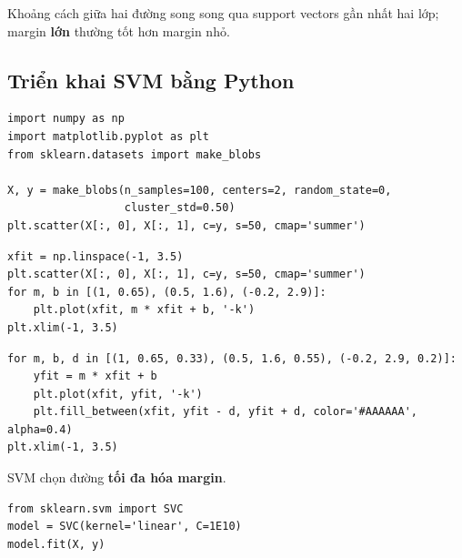 \begin{dinhnghia}[title={Margin}]
Khoảng cách giữa hai đường song song qua support vectors gần nhất hai lớp; margin \textbf{lớn} thường tốt hơn margin nhỏ.
\end{dinhnghia}

\subsection{Triển khai SVM bằng Python}

\begin{vidu}[title={Import và dữ liệu mẫu}]
\begin{lstlisting}
import numpy as np
import matplotlib.pyplot as plt
from sklearn.datasets import make_blobs

X, y = make_blobs(n_samples=100, centers=2, random_state=0,
                  cluster_std=0.50)
plt.scatter(X[:, 0], X[:, 1], c=y, s=50, cmap='summer')
\end{lstlisting}
\end{vidu}

\begin{vidu}[title={Nhiều đường phân tách có thể}]
\begin{lstlisting}
xfit = np.linspace(-1, 3.5)
plt.scatter(X[:, 0], X[:, 1], c=y, s=50, cmap='summer')
for m, b in [(1, 0.65), (0.5, 1.6), (-0.2, 2.9)]:
    plt.plot(xfit, m * xfit + b, '-k')
plt.xlim(-1, 3.5)
\end{lstlisting}
\end{vidu}

\begin{vidu}[title={Maximum Marginal Hyperplane (MMH)}]
\begin{lstlisting}
for m, b, d in [(1, 0.65, 0.33), (0.5, 1.6, 0.55), (-0.2, 2.9, 0.2)]:
    yfit = m * xfit + b
    plt.plot(xfit, yfit, '-k')
    plt.fill_between(xfit, yfit - d, yfit + d, color='#AAAAAA', alpha=0.4)
plt.xlim(-1, 3.5)
\end{lstlisting}

SVM chọn đường \textbf{tối đa hóa margin}.
\end{vidu}

\begin{vidu}[title={SVC kernel tuyến tính}]
\begin{lstlisting}
from sklearn.svm import SVC
model = SVC(kernel='linear', C=1E10)
model.fit(X, y)
\end{lstlisting}
\end{vidu}

